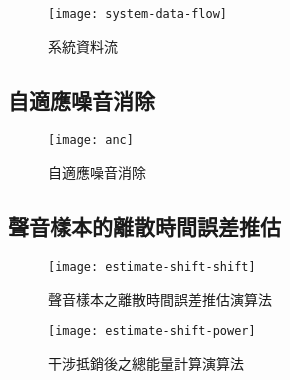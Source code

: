 \begin{figure}[H]
    \centering
    \texttt{[image: system-data-flow]}
    \caption{系統資料流}
    \label{fig:system-data-flow}
\end{figure}

\subsection{自適應噪音消除}

\begin{figure}[H]
    \centering
    \texttt{[image: anc]}
    \caption{自適應噪音消除}
    \label{fig:anc}
\end{figure}


\subsection{聲音樣本的離散時間誤差推估}

\begin{figure}[H]
    \centering
    \texttt{[image: estimate-shift-shift]}
    \caption{聲音樣本之離散時間誤差推估演算法}
    \label{fig:estimate-shift}
\end{figure}

\begin{figure}[H]
    \centering
    \texttt{[image: estimate-shift-power]}
    \caption{干涉抵銷後之總能量計算演算法}
    \label{fig:estimate-power}
\end{figure}
